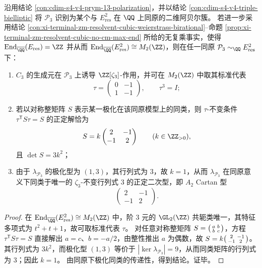 \begin{proposition}\label{prop:cdim-s4-v4-prym-a2-polarization-class}
沿用结论 \ref{con:cdim-s4-v4-prym-13-polarization}，并以结论 \ref{con:cdim-s4-v4-triple-bielliptic} 将 \(\mathcal P_3\) 识别为某个与 \(E_{\mathrm{res}}^2\) 在 \(\QQ\) 上同原的二维阿贝尔簇。
若进一步采用结论 \ref{con:xi-terminal-zm-resolvent-cubic-weierstrass-birational}--命题 \ref{prop:xi-terminal-zm-resolvent-cubic-no-cm-max-end} 所给的无复乘事实，使得
\(
\mathrm{End}_{\overline{\QQ}}(E_{\mathrm{res}})=\ZZ
\)
并从而 \(\mathrm{End}_{\overline{\QQ}}(E_{\mathrm{res}}^{2})\cong M_2(\ZZ)\)，则在任一同原 \(\mathcal P_3\sim_{\QQ}E_{\mathrm{res}}^2\) 下：
\begin{enumerate}
  \item \(C_3\) 的生成元在 \(\mathcal P_3\) 上诱导 \(\ZZ[\zeta_3]\)-作用，并可在 \(M_2(\ZZ)\) 中取其标准代表
  \[
  \tau=\begin{pmatrix}0&-1\\ 1&-1\end{pmatrix},
  \qquad \tau^3=I;
  \]
  \item 若以对称整矩阵 \(S\) 表示某一极化在该同原模型上的同类，则 \(\tau\)-不变条件 \(\tau^{\mathsf T}S\tau=S\) 的正定解恰为
  \[
  S=k\begin{pmatrix}2&-1\\ -1&2\end{pmatrix}\qquad(k\in\ZZ_{>0}),
  \]
  且 \(\det S=3k^2\)；
  \item 由于 \(\lambda_{\mathcal P_3}\) 的极化型为 \((1,3)\)，其行列式为 \(3\)，故 \(k=1\)，从而 \(\lambda_{\mathcal P_3}\) 在同原意义下同类于唯一的 \(\zeta_3\)-不变行列式 \(3\) 的正定二次型，即 \(A_2\) Cartan 型
  \[
  \begin{pmatrix}2&-1\\ -1&2\end{pmatrix}.
  \]
\end{enumerate}
\end{proposition}
\begin{proof}
在 \(\mathrm{End}_{\overline{\QQ}}(E_{\mathrm{res}}^{2})\cong M_2(\ZZ)\) 中，阶 \(3\) 元的 \(\GL_2(\ZZ)\) 共轭类唯一，其特征多项式为 \(t^2+t+1\)，故可取标准代表 \(\tau\)。
对任意对称整矩阵 \(S=\begin{psmallmatrix}a&b\\ b&c\end{psmallmatrix}\)，方程 \(\tau^{\mathsf T}S\tau=S\) 直接解出 \(a=c\)、\(b=-a/2\)，由整性推出 \(a\) 为偶数，故 \(S=k\begin{psmallmatrix}2&-1\\ -1&2\end{psmallmatrix}\)。
其行列式为 \(3k^2\)，而极化型 \((1,3)\) 等价于 \(|\ker\lambda_{\mathcal P_3}|=9\)，从而同类矩阵的行列式为 \(3\)；因此 \(k=1\)。
由同原下极化同类的传递性，得到结论。证毕。
\end{proof}


